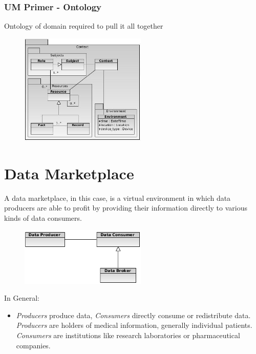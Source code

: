 \documentclass[t, 10pt]{beamer}
\begin{document}
\begin{frame}
\frametitle{UM Primer - Ontology}

Ontology of domain required to pull it all together
\begin{figure}
\includegraphics[width = 6cm]{UMOntology}
\end{figure}

\end{frame}

\section{Data Marketplace}
\begin{frame}
A data marketplace, in this case, is a virtual environment in which data producers are able to profit by providing their information directly to various kinds of data consumers.  

\begin{figure}
\includegraphics[width = 6cm]{roles}
\end{figure}
\pause

In General:
\begin{itemize}
\item \textit{Producers} produce data, \textit{Consumers} directly consume or redistribute data.  \textit{Producers} are holders of medical information, generally individual patients. \textit{Consumers} are institutions like research laboratories or pharmaceutical companies.
\end{itemize}

\end{frame}
\end{document}

